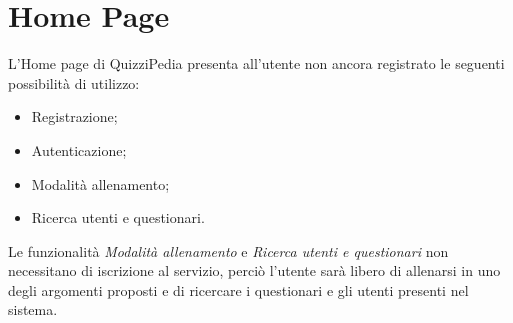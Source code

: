 \newpage
\section{Home Page}
L'Home page di QuizziPedia presenta all'utente non ancora registrato le seguenti possibilità di utilizzo:
\begin{itemize}
	\item Registrazione;
	\item Autenticazione;
	\item Modalità allenamento;
	\item Ricerca utenti e questionari.
\end{itemize}
Le funzionalità \textit{Modalità allenamento} e \textit{Ricerca utenti e questionari} non necessitano di iscrizione al servizio, perciò l'utente sarà libero di allenarsi in uno degli argomenti proposti e di ricercare i questionari e gli utenti presenti nel sistema.